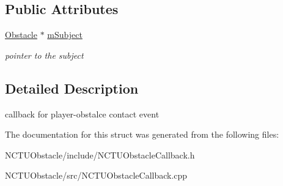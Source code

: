\subsection*{Public Attributes}
\begin{DoxyCompactItemize}
\item 
\hyperlink{class_n_c_t_u_1_1_obstacle}{Obstacle} $\ast$ \hyperlink{struct_n_c_t_u_1_1_obstacle_contact_result_callback_aa14f909b30ebcc73112813427abb554e}{m\+Subject}\hypertarget{struct_n_c_t_u_1_1_obstacle_contact_result_callback_aa14f909b30ebcc73112813427abb554e}{}\label{struct_n_c_t_u_1_1_obstacle_contact_result_callback_aa14f909b30ebcc73112813427abb554e}

\begin{DoxyCompactList}\small\item\em pointer to the subject \end{DoxyCompactList}\end{DoxyCompactItemize}


\subsection{Detailed Description}
callback for player-\/obstalce contact event 

The documentation for this struct was generated from the following files\+:\begin{DoxyCompactItemize}
\item 
N\+C\+T\+U\+Obstacle/include/N\+C\+T\+U\+Obstacle\+Callback.\+h\item 
N\+C\+T\+U\+Obstacle/src/N\+C\+T\+U\+Obstacle\+Callback.\+cpp\end{DoxyCompactItemize}
